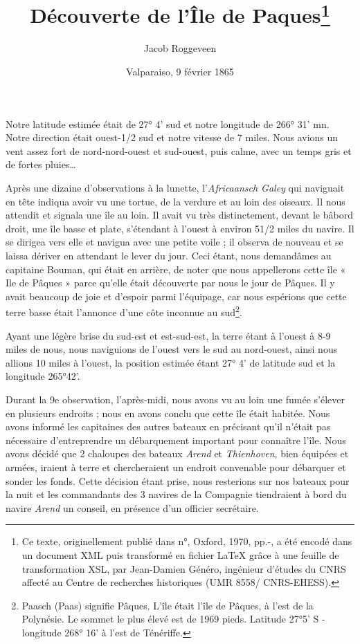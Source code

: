 \documentclass{article}
\title{Découverte de l'Île de Paques\footnote{Ce texte, originellement publié dans \textit{} n°, Oxford, 1970, pp.-, a été encodé dans un document XML puis transformé en fichier \LaTeX{} grâce à une feuille de transformation XSL, par Jean-Damien Généro, ingénieur d'études du CNRS affecté au Centre de recherches historiques (UMR 8558/ CNRS-EHESS).}}
\author{Jacob Roggeveen}
\date{Valparaiso, 9 février 1865}
\begin{document}
        \maketitle
        
      
         
        
    Notre latitude estimée était de 27° 4' sud et notre longitude de 266° 31' mn. Notre direction était ouest-1/2 sud et notre vitesse de 7 miles. Nous avions un vent assez fort de nord-nord-ouest et sud-ouest, puis calme, avec un temps gris et de fortes pluies…
         
        
    Après une dizaine d'observations à la lunette, l'\textit{Africaansch Galey} qui naviguait en tête indiqua avoir vu une tortue, de la verdure et au loin des oiseaux. Il nous attendit et signala une île au loin. Il avait vu très distinctement, devant le bâbord droit, une île basse et plate, s'étendant à l'ouest à environ 51/2 miles du navire. Il se dirigea vers elle et navigua avec une petite voile ; il observa de nouveau et se laissa dériver en attendant le lever du jour. Ceci étant, nous demandâmes au capitaine Bouman, qui était en arrière, de noter que nous appellerons cette île « Ile de Pâques » parce qu'elle était découverte par nous le jour de Pâques. Il y avait beaucoup de joie et d'espoir parmi l'équipage, car nous espérions que cette terre basse était l'annonce d'une côte inconnue au sud\footnote{Paasch (Paas) signifie Pâques. L'île était l'île de Pâques, à l'est de la Polynésie. Le sommet le plus élevé est de 1969 pieds. Latitude 27°5' S - longitude 268° 16' à l'est de Ténériffe.}.
         
        
    Ayant une légère brise du sud-est et est-sud-est, la terre étant à l'ouest à 8-9 miles de nous, nous naviguions de l'ouest vers le sud au nord-ouest, ainsi nous allions 10 miles à l'ouest, la position estimée étant 27° 4' de latitude sud et la longitude 265°42'.
         
        
    Durant la 9e observation, l'après-midi, nous avons vu au loin une fumée s'élever en plusieurs endroits ; nous en avons conclu que cette île était habitée. Nous avons informé les capitaines des autres bateaux en précisant qu'il n'était pas nécessaire d'entreprendre un débarquement important pour connaître l'île. Nous avons décidé que 2 chaloupes des bateaux \textit{Arend} et \textit{Thienhoven}, bien équipées et armées, iraient à terre et chercheraient un endroit convenable pour débarquer et sonder les fonds. Cette décision étant prise, nous resterions sur nos bateaux pour la nuit et les commandants des 3 navires de la Compagnie tiendraient à bord du navire \textit{Arend} un conseil, en présence d'un officier secrétaire.
         
\end{document}
